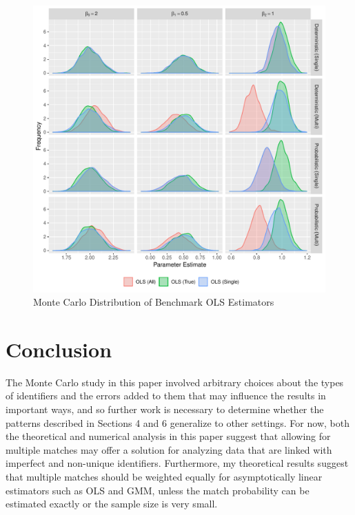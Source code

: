 \documentclass[12pt]{article}
\begin{document}
\begin{figure}[htbp]
\begin{center}
\label{benchmark}
\caption{Monte Carlo Distribution of Benchmark OLS Estimators}
\includegraphics[width=1.1\textwidth]{./Figures/compare.pdf}
\end{center}
\end{figure}

\section{Conclusion}

The Monte Carlo study in this paper involved arbitrary choices about the types of identifiers and the errors added to them that may influence the results in important ways, and so further work is necessary to determine whether the patterns described in Sections 4 and 6 generalize to other settings.  For now, both the theoretical and numerical analysis in this paper suggest that allowing for multiple matches may offer a solution for analyzing data that are linked with imperfect and non-unique identifiers.  Furthermore, my theoretical results suggest that multiple matches should be weighted equally for asymptotically linear estimators such as OLS and GMM, unless the match probability can be estimated exactly or the sample size is very small.  
\end{document}
